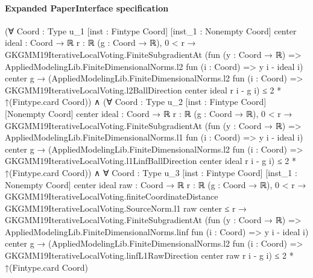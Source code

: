 \documentclass[10pt]{article}
\begin{document}
\paragraph{Expanded PaperInterface specification}
\begin{ReviewVerbatim}
(∀ {Coord : Type u_1} [inst : Fintype Coord] [inst_1 : Nonempty Coord] {center ideal : Coord → ℝ} {r : ℝ}
    (g : Coord → ℝ),
    0 < r →
      GKGMM19IterativeLocalVoting.FiniteSubgradientAt
          (fun (y : Coord → ℝ) => AppliedModelingLib.FiniteDimensionalNorms.l2 fun (i : Coord) => y i - ideal i) center
          g →
        (AppliedModelingLib.FiniteDimensionalNorms.l2 fun (i : Coord) =>
            GKGMM19IterativeLocalVoting.l2BallDirection center ideal r i - g i) ≤
          2 * ↑(Fintype.card Coord)) ∧
  (∀ {Coord : Type u_2} [inst : Fintype Coord] [Nonempty Coord] {center ideal : Coord → ℝ} {r : ℝ} (g : Coord → ℝ),
      0 < r →
        GKGMM19IterativeLocalVoting.FiniteSubgradientAt
            (fun (y : Coord → ℝ) => AppliedModelingLib.FiniteDimensionalNorms.l1 fun (i : Coord) => y i - ideal i)
            center g →
          (AppliedModelingLib.FiniteDimensionalNorms.l2 fun (i : Coord) =>
              GKGMM19IterativeLocalVoting.l1LinfBallDirection center ideal r i - g i) ≤
            2 * ↑(Fintype.card Coord)) ∧
    ∀ {Coord : Type u_3} [inst : Fintype Coord] [inst_1 : Nonempty Coord] {center ideal raw : Coord → ℝ} {r : ℝ}
      (g : Coord → ℝ),
      0 < r →
        GKGMM19IterativeLocalVoting.finiteCoordinateDistance GKGMM19IterativeLocalVoting.SourceNorm.l1 raw center ≤ r →
          GKGMM19IterativeLocalVoting.FiniteSubgradientAt
              (fun (y : Coord → ℝ) => AppliedModelingLib.FiniteDimensionalNorms.linf fun (i : Coord) => y i - ideal i)
              center g →
            (AppliedModelingLib.FiniteDimensionalNorms.l2 fun (i : Coord) =>
                GKGMM19IterativeLocalVoting.linfL1RawDirection center raw r i - g i) ≤
              2 * ↑(Fintype.card Coord)
\end{ReviewVerbatim}
\end{document}

